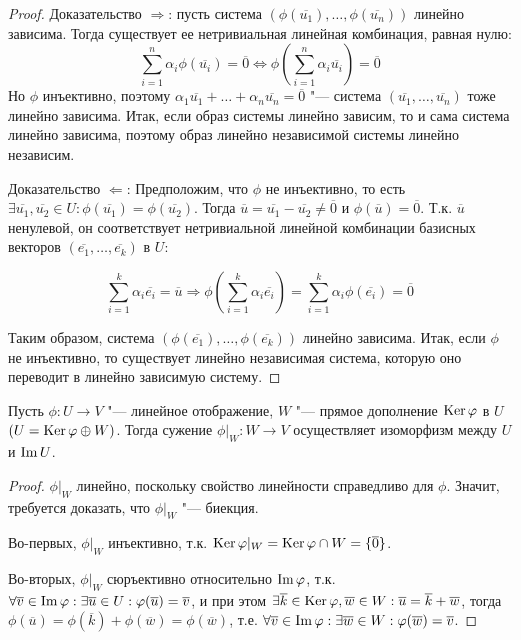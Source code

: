 \begin{proof}
	Доказательство $\Rightarrow$: пусть система $(\phi(\overline{u_1}), \dots, \phi(\overline{u_n}))$ линейно зависима. Тогда существует ее нетривиальная линейная комбинация, равная нулю:
	\[\sum_{i = 1}^n\alpha_i\phi(\overline{u_i}) = \overline{0} \Leftrightarrow \phi\left(\sum_{i = 1}^n\alpha_i\overline{u_i}\right) = \overline{0}\]
	Но $\phi$ инъективно, поэтому $\alpha_1\overline{u_1} + \dots + \alpha_n\overline{u_n} = \overline{0}$ "--- система $(\overline{u_1}, \dots, \overline{u_n})$ тоже линейно зависима. Итак, если образ системы линейно зависим, то и сама система линейно зависима, поэтому образ линейно независимой системы линейно независим.
	
	Доказательство $\Leftarrow$: Предположим, что $\phi$ не инъективно, то есть $\exists \overline{u_1}, \overline{u_2} \in U: \phi(\overline{u_1}) = \phi(\overline{u_2})$. Тогда $\overline{u} = \overline{u_1} - \overline{u_2} \ne \overline{0}$ и $\phi(\overline{u}) = \overline{0}$. Т.\:к. $\overline{u}$ ненулевой, он соответствует нетривиальной линейной комбинации базисных векторов $(\overline{e_1}, \dots, \overline{e_k})$ в $U$:
	
	\[\sum_{i = 1}^{k}\alpha_i\overline{e_i} = \overline{u} \Rightarrow \phi\left(\sum_{i = 1}^{k}\alpha_i\overline{e_i}\right) = \sum_{i = 1}^{k}\alpha_i\phi(\overline{e_i}) = \overline{0}\]
	
	Таким образом, система $(\phi(\overline{e_1}), \dots, \phi(\overline{e_k}))$ линейно зависима. Итак, если $\phi$ не инъективно, то существует линейно независимая система, которую оно переводит в линейно зависимую систему.
\end{proof}

\begin{proposition}
	Пусть $\phi: U \rightarrow V$ "--- линейное отображение, $W$ "--- прямое дополнение $\operatorname{Ker}{\varphi}$ в $U$ $(U = \operatorname{Ker}{\varphi} \oplus W)$. Тогда сужение $\phi|_W : W \rightarrow V$ осуществляет изоморфизм между $U$ и $\operatorname{Im}{U}$.
\end{proposition}

\begin{proof}
	$\phi|_W$ линейно, поскольку свойство линейности справедливо для $\phi$. Значит, требуется доказать, что $\phi|_W$ "--- биекция.
	
	Во-первых, $\phi|_W$ инъективно, т.\:к. $ \operatorname{Ker}{\varphi|_W} = \operatorname{Ker}{\varphi} \cap W = \{\overline{0}\}$.
	
	Во-вторых, $\phi|_W$ сюръективно относительно $\operatorname{Im}{\varphi}$, т.\:к. $\forall \overline{v} \in \operatorname{Im}{\varphi}: \exists \overline{u} \in U: \varphi(\overline{u}) = \overline{v}$, и при этом $\exists \overline{k} \in \operatorname{Ker}{\varphi}, \overline{w} \in W: \overline{u} = \overline{k} + \overline{w}$, тогда $\phi(\overline{u}) = \phi(\overline{k}) + \phi(\overline{w}) = \phi(\overline{w})$, т.\:е. $\forall \overline{v} \in \operatorname{Im}{\varphi}: \exists \overline{w} \in W: \varphi(\overline{w}) = \overline{v}$.
\end{proof}

